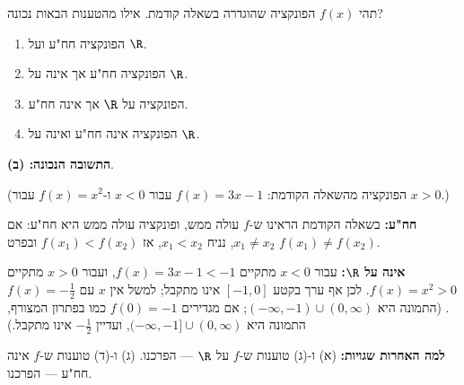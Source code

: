 
\begin{question}
תהי $f(x)$ הפונקציה שהוגדרה בשאלה קודמת. אילו מהטענות הבאות נכונה?
\begin{enumerate}
  \item הפונקציה חח"ע ועל $\R$.
  \item הפונקציה חח"ע אך אינה על $\R$.
  \item הפונקציה על $\R$ אך אינה חח"ע.
  \item הפונקציה אינה חח"ע ואינה על $\R$.
\end{enumerate}
\end{question}

\begin{solution}
\textbf{התשובה הנכונה: (ב)}.

(הפונקציה מהשאלה הקודמת: $f(x)=3x-1$ עבור $x<0$ ו-$f(x)=x^2$ עבור $x>0$.)

\textbf{חח"ע:} בשאלה הקודמת הראינו ש-$f$ עולה ממש, ופונקציה עולה ממש היא חח"ע: אם $x_1\neq x_2$, נניח $x_1<x_2$, אז $f(x_1)<f(x_2)$ ובפרט $f(x_1)\neq f(x_2)$.

\textbf{אינה על $\R$:} עבור $x<0$ מתקיים $f(x)=3x-1<-1$, ועבור $x>0$ מתקיים $f(x)=x^2>0$. לכן אף ערך בקטע $[-1,0]$ אינו מתקבל; למשל אין $x$ עם $f(x)=-\frac12$. (התמונה היא $(-\infty,-1)\cup(0,\infty)$; אם מגדירים $f(0)=-1$ כמו בפתרון המצורף, התמונה היא $(-\infty,-1]\cup(0,\infty)$, ועדיין $-\frac12$ אינו מתקבל.)

\textbf{למה האחרות שגויות:} (א) ו-(ג) טוענות ש-$f$ על $\R$ — הפרכנו. (ג) ו-(ד) טוענות ש-$f$ אינה חח"ע — הפרכנו.
\end{solution}
